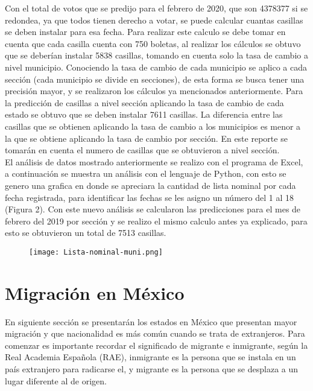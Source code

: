 \documentclass{article}
\begin{document}
Con el total de votos que se predijo para el febrero de 2020, que son 4378377 si se redondea, ya que todos tienen derecho a votar, se puede calcular cuantas casillas se deben instalar para esa fecha. Para realizar este calculo se debe tomar en cuenta que cada casilla cuenta con 750 boletas, al realizar los cálculos se obtuvo que se deberían instalar 5838 casillas, tomando en cuenta solo la tasa de cambio a nivel municipio.
Conociendo la tasa de cambio de cada municipio se aplico a cada sección (cada municipio se divide en secciones), de esta forma se busca tener una precisión mayor, y se realizaron los cálculos ya mencionados anteriormente. Para la predicción de casillas a nivel sección aplicando la tasa de cambio de cada estado se obtuvo que se deben instalar 7611 casillas. La diferencia entre las casillas que se obtienen aplicando la tasa de cambio a los municipios es menor a la que se obtiene aplicando la tasa de cambio por sección. En este reporte se tomarán en cuenta el numero de casillas que se obtuvieron a nivel sección.\\

El análisis de datos mostrado anteriormente se realizo con el programa de Excel, a continuación se muestra un análisis con el lenguaje de Python, con esto se genero una grafica en donde se apreciara la cantidad de lista nominal por cada fecha registrada, para identificar las fechas se les asigno un número del 1 al 18 (Figura 2). Con este nuevo análisis se calcularon las predicciones para el mes de febrero del 2019 por sección y se realizo el mismo calculo antes ya explicado, para esto se obtuvieron un total de 7513 casillas.
\begin{figure}[!] 
  \texttt{[image: Lista-nominal-muni.png]}
  \centering
  \caption{}
  \label{fig:Lista-mes.jpg.}
\end{figure}

\section{Migración en México}
En siguiente sección se presentarán los estados en México que presentan mayor migración y que nacionalidad es más común cuando se trata de extranjeros. Para comenzar es importante recordar el significado de migrante e inmigrante, según la Real Academia Española (RAE), inmigrante es la persona que se instala en un país extranjero para radicarse el, y migrante es la persona que se desplaza a un lugar diferente al de origen.\\
\end{document}

